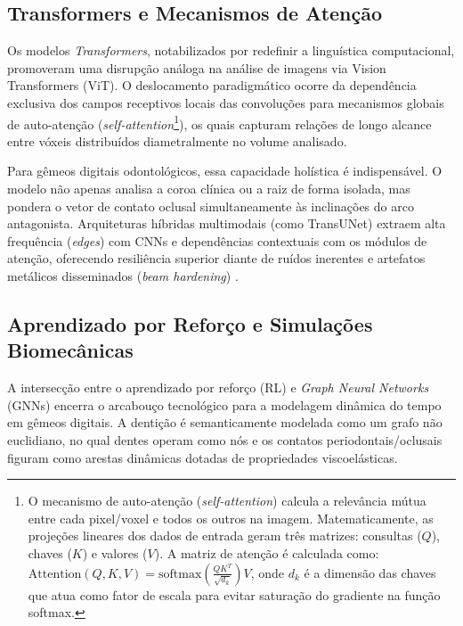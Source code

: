 \subsection{Transformers e Mecanismos de Atenção}
\label{subsec:transformers}

Os modelos \textit{Transformers}, notabilizados por redefinir a linguística computacional, promoveram uma disrupção análoga na análise de imagens via Vision Transformers (ViT). O deslocamento paradigmático ocorre da dependência exclusiva dos campos receptivos locais das convoluções para mecanismos globais de auto-atenção (\textit{self-attention}\footnote{O mecanismo de auto-atenção (\textit{self-attention}) calcula a relevância mútua entre cada pixel/voxel e todos os outros na imagem. Matematicamente, as projeções lineares dos dados de entrada geram três matrizes: consultas ($Q$), chaves ($K$) e valores ($V$). A matriz de atenção é calculada como: $\text{Attention}(Q, K, V) = \text{softmax}\left(\frac{QK^T}{\sqrt{d_k}}\right)V$, onde $d_k$ é a dimensão das chaves que atua como fator de escala para evitar saturação do gradiente na função softmax.}), os quais capturam relações de longo alcance entre vóxeis distribuídos diametralmente no volume analisado.

Para gêmeos digitais odontológicos, essa capacidade holística é indispensável. O modelo não apenas analisa a coroa clínica ou a raiz de forma isolada, mas pondera o vetor de contato oclusal simultaneamente às inclinações do arco antagonista. Arquiteturas híbridas multimodais (como TransUNet) extraem alta frequência (\textit{edges}) com CNNs e dependências contextuais com os módulos de atenção, oferecendo resiliência superior diante de ruídos inerentes e artefatos metálicos disseminados (\textit{beam hardening}) \cite{mdpi2025digital}.

\subsection{Aprendizado por Reforço e Simulações Biomecânicas}
\label{subsec:aprendizado-reforco}

A intersecção entre o aprendizado por reforço (RL) e \textit{Graph Neural Networks} (GNNs) encerra o arcabouço tecnológico para a modelagem dinâmica do tempo em gêmeos digitais. A dentição é semanticamente modelada como um grafo não euclidiano, no qual dentes operam como nós e os contatos periodontais/oclusais figuram como arestas dinâmicas dotadas de propriedades viscoelásticas.

